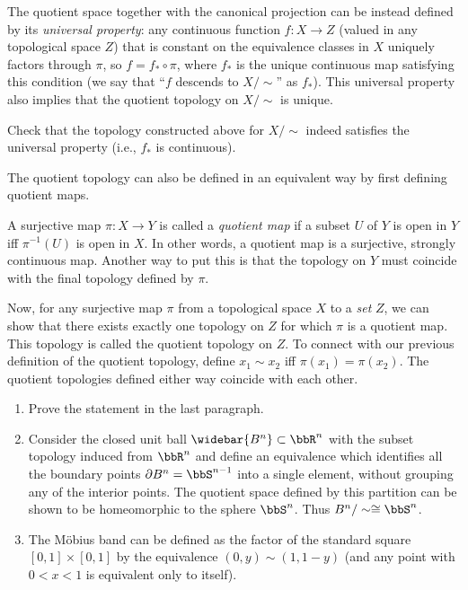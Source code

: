 The quotient space together with the canonical projection can be instead defined by its \emph{universal property}: any continuous function $f:X\to Z$ (valued in any topological space $Z$) that is constant on the equivalence classes in $X$ uniquely factors through  $\pi$, so $f=f_\ast\circ\pi$, where $f_\ast$ is the unique continuous map satisfying this condition (we say that ``$f$ descends to $X/\sim$'' as $f_\ast$). This universal property also implies that the quotient topology on $X\slash\sim$ is unique.

\begin{xca}
    Check that the topology constructed above for $X/\sim$ indeed satisfies the universal property (i.e., $f_\ast$ is continuous).
\end{xca}

The quotient topology can also be defined in an equivalent way by first defining quotient maps.
\begin{defn}
    A surjective map $\pi:X\rightarrow Y$ is called a \emph{quotient map} if a subset $U$ of $Y$ is open in $Y$ iff $\pi^{-1}(U)$ is open in $X$. In other words, a quotient map is a surjective, strongly continuous map. Another way to put this is that the topology on $Y$ must coincide with the final topology defined by $\pi$.
\end{defn}

Now, for any surjective map $\pi$ from a topological space $X$ to a \emph{set} $Z$, we can show that there exists exactly one topology on $Z$ for which $\pi$ is a quotient map. This topology is called the quotient topology on $Z$. To connect with our previous definition of the quotient topology, define $x_1\sim x_2$ iff $\pi(x_1)=\pi(x_2)$. The quotient topologies defined either way coincide with each other.

\begin{example}
\begin{enumerate}
    \item Prove the statement in the last paragraph.
    \item Consider the closed unit ball $\widebar{B^n}\subset\bbR^n$ with the subset topology induced from $\bbR^n$ and define an equivalence which identifies all the boundary points $\partial B^n = \bbS^{n-1}$ into a single element, without grouping any of the interior points. The quotient space defined by this partition can be shown to be homeomorphic to the sphere $\bbS^n$. Thus $B^n/\sim \cong \bbS^n$.
    \item The M\"obius band can be defined as the factor of the standard square $[0,1]\times[0,1]$ by the equivalence $(0,y)\sim (1,1-y)$ (and any point with $0<x<1$ is equivalent only to itself).
\end{enumerate}
\end{example}

